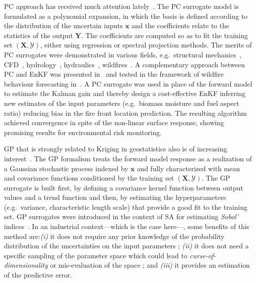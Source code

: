PC approach has received much attention lately~\citep{dubreuil2014,sudret2008,xiu2010,xiu2002,Ciriello2013}. The PC surrogate model is formulated as a polynomial expansion, in which the basis is defined according to the distribution of the uncertain inputs $\mathbf{x}$ and the coefficients relate to the statistics of the output $\mathbf{Y}$. The coefficients are computed so as to fit the training set $(\mathbf{X}, \mathcal{Y})$, either using regression or spectral projection methods. The merits of PC surrogates were demonstrated in various fields, e.g.~structural mechanics~\citep{dubreuil2014,berveiller2005}, CFD~\citep{hosder2006,lucor2007,saad2007phd}, hydrology~\citep{deman2015}, hydraulics~\citep{ge2008,elmocaydphd}, wildfires~\citep{rochoux2014}. A complementary approach between PC and EnKF was presented in~\citet{lixiu2009} and tested in the framework of wildfire behaviour forecasting in~\citet{rochoux2014}. A PC surrogate was used in place of the forward model to estimate the Kalman gain and thereby design a cost-effective EnKF inferring new estimates of the input parameters (e.g.~biomass moisture and fuel aspect ratio) reducing bias in the fire front location prediction. The resulting algorithm achieved convergence in spite of the non-linear surface response, showing promising results for environmental risk monitoring. 

GP that is strongly related to Kriging in geostatistics also is of increasing interest~\citep{rasmussen2006,legratiet2017,lockwood2012,marrel2015}. The GP formalism treats the forward model response as a realization of a Gaussian stochastic process indexed by $\mathbf{x}$ and fully characterized with mean and covariance functions conditioned by the training set $(\mathbf{X}, \mathcal{Y})$. The GP surrogate is built first, by defining a covariance kernel function between output values and a trend function and then, by estimating the hyperparameters (e.g.~variance, characteristic length scale) that provide a good fit to the training set. GP surrogates were introduced in the context of SA for estimating \emph{Sobol'} indices~\citep{oakley2004,marrel2009,legratiet2014}. In an industrial context---which is the case here---, some benefits of this method are:\textit{(i)} it does not require any prior knowledge of the probability distribution of the uncertainties on the input parameters ; \textit{(ii)} it does not need a specific sampling of the parameter space which could lead to \textit{curse-of-dimensionality} or mis-evaluation of the space ; and \textit{(iii)} it provides an estimation of the predictive error.

